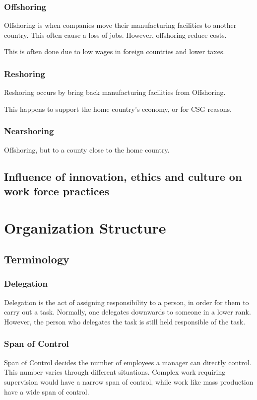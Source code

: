 \documentclass{report}
\begin{document}
\subsection{Offshoring}
Offshoring is when companies move their manufacturing facilities to another country.
This often cause a loss of jobs.  
However, offshoring reduce costs.

This is often done due to low wages in foreign countries and lower taxes.

\subsection{Reshoring}
Reshoring occurs by bring back manufacturing facilities from Offshoring.

This happens to support the home country's economy, or for CSG reasons.

\subsection{Nearshoring}
Offshoring, but to a county close to the home country.

\section{Influence of innovation, ethics and culture on work force practices}

\chapter{Organization Structure}

\section{Terminology}
\subsection{Delegation}
Delegation is the act of assigning responsibility to a person, in order for them to carry out a task.
Normally, one delegates downwards to someone in a lower rank.
However, the person who delegates the task is still held responsible of the task.

\subsection{Span of Control}
Span of Control decides the number of employees a manager can directly control.
This number varies through different situations.
Complex work requiring supervision would have a narrow span of control, while work like mass production have a wide span of control.
\end{document}

